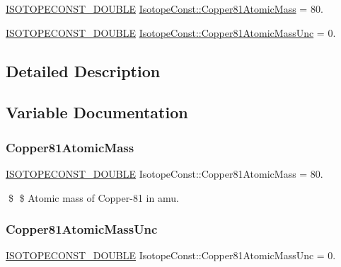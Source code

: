 \begin{DoxyCompactItemize}
\item 
\mbox{\hyperlink{group___isotope_const-_macros_ga8f45a7272ce02c0b4c65c44636ed719a}{I\+S\+O\+T\+O\+P\+E\+C\+O\+N\+S\+T\+\_\+\+D\+O\+U\+B\+LE}} \mbox{\hyperlink{group___isotope_const-_copper-_cu81_gaa2be6aa182870c831f6bf1812f1dba91}{Isotope\+Const\+::\+Copper81\+Atomic\+Mass}} = 80.
\item 
\mbox{\hyperlink{group___isotope_const-_macros_ga8f45a7272ce02c0b4c65c44636ed719a}{I\+S\+O\+T\+O\+P\+E\+C\+O\+N\+S\+T\+\_\+\+D\+O\+U\+B\+LE}} \mbox{\hyperlink{group___isotope_const-_copper-_cu81_gaeb9e2aa8bd7d0bdfd62ef326c12f0e22}{Isotope\+Const\+::\+Copper81\+Atomic\+Mass\+Unc}} = 0.
\end{DoxyCompactItemize}


\subsection{Detailed Description}


\subsection{Variable Documentation}
\mbox{\label{group___isotope_const-_copper-_cu81_gaa2be6aa182870c831f6bf1812f1dba91}} 
\subsubsection{\texorpdfstring{Copper81\+Atomic\+Mass}{Copper81AtomicMass}}
{\footnotesize\ttfamily \mbox{\hyperlink{group___isotope_const-_macros_ga8f45a7272ce02c0b4c65c44636ed719a}{I\+S\+O\+T\+O\+P\+E\+C\+O\+N\+S\+T\+\_\+\+D\+O\+U\+B\+LE}} Isotope\+Const\+::\+Copper81\+Atomic\+Mass = 80.}

\$ \$ Atomic mass of Copper-\/81 in amu. \mbox{\label{group___isotope_const-_copper-_cu81_gaeb9e2aa8bd7d0bdfd62ef326c12f0e22}} 
\subsubsection{\texorpdfstring{Copper81\+Atomic\+Mass\+Unc}{Copper81AtomicMassUnc}}
{\footnotesize\ttfamily \mbox{\hyperlink{group___isotope_const-_macros_ga8f45a7272ce02c0b4c65c44636ed719a}{I\+S\+O\+T\+O\+P\+E\+C\+O\+N\+S\+T\+\_\+\+D\+O\+U\+B\+LE}} Isotope\+Const\+::\+Copper81\+Atomic\+Mass\+Unc = 0.}

